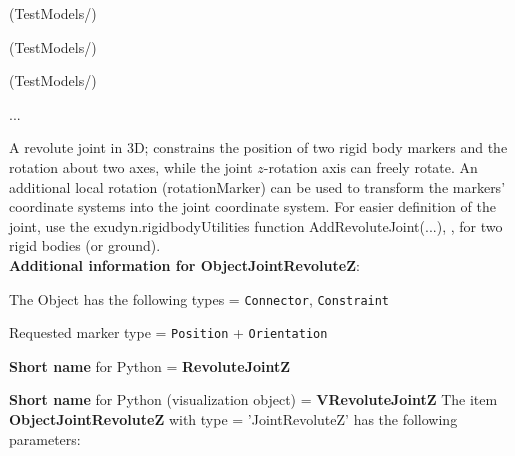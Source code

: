 \item {} (TestModels/)
\item {} (TestModels/)
\item {} (TestModels/)
\item  ...

\ei

%
\newpage

\label{sec:item:ObjectJointRevoluteZ}
A revolute joint in 3D; constrains the position of two rigid body markers and the rotation about two axes, while the joint $z$-rotation axis can freely rotate. An additional local rotation (rotationMarker) can be used to transform the markers' coordinate systems into the joint coordinate system. For easier definition of the joint, use the exudyn.rigidbodyUtilities function AddRevoluteJoint(...), , for two rigid bodies (or ground).
 \vspace{12pt}
 \\{\bf Additional information for ObjectJointRevoluteZ}:
\bi
  \item The Object has the following types = \texttt{Connector}, \texttt{Constraint}
  \item Requested marker type = \texttt{Position} + \texttt{Orientation}
  \item {\bf Short name} for Python = {\bf RevoluteJointZ}  \item {\bf Short name} for Python (visualization object) = {\bf VRevoluteJointZ}\ei
\vspace{12pt} \noindent The item {\bf ObjectJointRevoluteZ} with type = 'JointRevoluteZ' has the following parameters:\vspace{-1cm}\\ 
